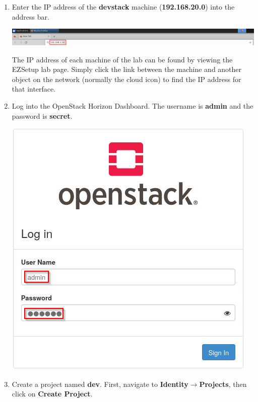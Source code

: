\documentclass[letterpaper, 12pt]{article}
\begin{document}
\begin{enumerate}
    \item Enter the IP address of the \textbf{devstack} machine (\textbf{192.168.20.0}) into the address bar.
    
    \begin{center}
        \includegraphics[width=\linewidth]{images/part1/step6.png}
    \end{center}

    \begin{tipbox}{}
        The IP address of each machine of the lab can be found by viewing the EZSetup lab page. Simply click the link
        between the machine and another object on the network (normally the cloud icon) to find the IP address for that
        interface.
    \end{tipbox}

    \item Log into the OpenStack Horizon Dashboard. The username is \textbf{admin} and the password is \textbf{secret}.
    
    \begin{center}
        \includegraphics[scale=0.75]{images/part1/step7.png}
    \end{center}

    \item Create a project named \textbf{dev}. First, navigate to \textbf{Identity$\rightarrow$Projects}, then click on
    \textbf{Create Project}.


\end{enumerate}
\end{document}
